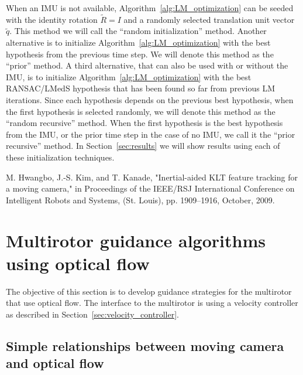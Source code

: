 When an IMU is not available, Algorithm~\ref{alg:LM_optimization} can be seeded with 
the identity rotation $\tilde{R}=I$ and a randomly selected translation unit vector $\tilde{q}$. This method we will call the ``random initialization'' method.
Another alternative is to initialize Algorithm~\ref{alg:LM_optimization} with the best hypothesis from the previous time step. We will denote this method as the ``prior'' method.  
A third alternative, that can also be used with or without the IMU, is to initialize Algorithm~\ref{alg:LM_optimization} with the best RANSAC/LMedS hypothesis that has been found so far from previous LM iterations. Since each hypothesis depends on the 
previous best hypothesis, when the first hypothesis is selected randomly, we will denote this method as the ``random recursive'' method.  When the first hypothesis is the best hypothesis from the IMU, or the prior time step in the case of no IMU, we call it the ``prior recursive'' method.  In Section~\ref{sec:results} we will show results using each of these initialization techniques.  


M. Hwangbo, J.-S. Kim, and T. Kanade, "Inertial-aided KLT feature tracking for a moving camera," in Proceedings of the IEEE/RSJ International Conference on Intelligent Robots and Systems, (St. Louis), pp. 1909--1916, October, 2009.



\section{Multirotor guidance algorithms using optical flow}
\label{sec:optical_flow_guidance}

The objective of this section is to develop guidance strategies for the multirotor that use optical flow.  The interface to the multirotor is using a velocity controller as described in Section~\ref{sec:velocity_controller}.

\subsection{Simple relationships between moving camera and optical flow}

